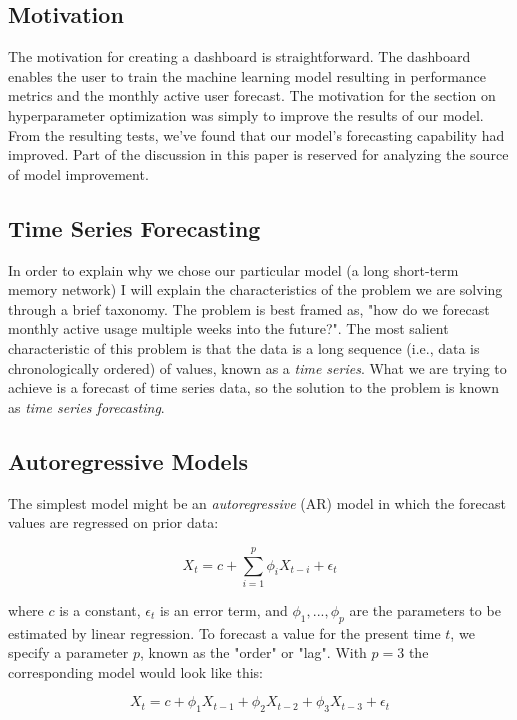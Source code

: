 \documentclass[11pt, oneside]{article}
\begin{document}
\subsection{Motivation}
The motivation for creating a dashboard is straightforward. The dashboard enables the user to train the machine learning model resulting in performance metrics and the monthly active user forecast.
The motivation for the section on hyperparameter optimization was simply to improve the results of our model. From the resulting tests, we've found that our model's forecasting capability had improved. Part of the discussion in this paper is reserved for analyzing the source of model improvement.

\subsection{Time Series Forecasting}

In order to explain why we chose our particular model (a long short-term memory network) I will explain the characteristics of the problem we are solving through a brief taxonomy. The problem is best framed as, "how do we forecast monthly active usage multiple weeks into the future?". The most salient characteristic of this problem is that the data is a long sequence (i.e., data is chronologically ordered) of values, known as a \textit{time series}. What we are trying to achieve is a forecast of time series data, so the solution to the problem is known as \textit{time series forecasting}.

\subsection{Autoregressive Models}

The simplest model might be an \textit{autoregressive} (AR) model in which the forecast values are regressed on prior data:

\begin{equation}
X_t = c + \sum_{i=1}^p \phi_i X_{t-i} + \epsilon_t
\end{equation}

where $c$ is a constant, $\epsilon_t$ is an error term, and $\phi_1, ..., \phi_p$ are the parameters to be estimated by linear regression. To forecast a value for the present time $t$, we specify a parameter $p$, known as the "order" or "lag". With $p=3$ the corresponding model would look like this:

\begin{equation}
X_t = c + \phi_1 X_{t-1} + \phi_2 X_{t-2} + \phi_3 X_{t-3} + \epsilon_t
\end{equation}
\end{document}
